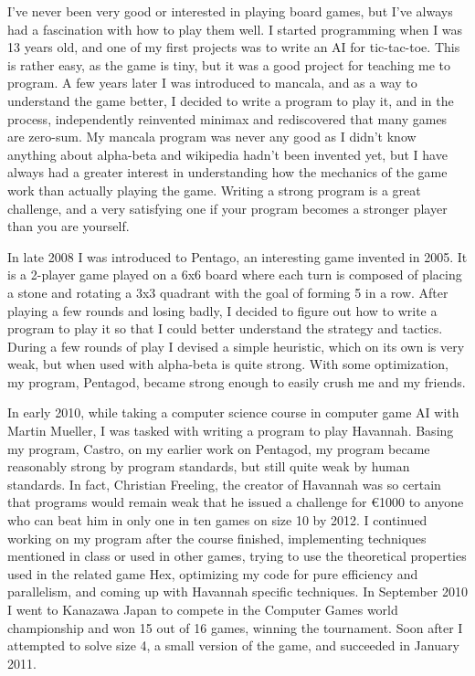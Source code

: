 I've never been very good or interested in playing board games, but I've always had a fascination with how to play them well. I started programming when I was 13 years old, and one of my first projects was to write an AI for tic-tac-toe. This is rather easy, as the game is tiny, but it was a good project for teaching me to program. A few years later I was introduced to mancala, and as a way to understand the game better, I decided to write a program to play it, and in the process, independently reinvented minimax and rediscovered that many games are zero-sum. My mancala program was never any good as I didn't know anything about alpha-beta and wikipedia hadn't been invented yet, but I have always had a greater interest in understanding how the mechanics of the game work than actually playing the game. Writing a strong program is a great challenge, and a very satisfying one if your program becomes a stronger player than you are yourself.

In late 2008 I was introduced to Pentago, an interesting game invented in 2005. It is a 2-player game played on a 6x6 board where each turn is composed of placing a stone and rotating a 3x3 quadrant with the goal of forming 5 in a row. After playing a few rounds and losing badly, I decided to figure out how to write a program to play it so that I could better understand the strategy and tactics. During a few rounds of play I devised a simple heuristic, which on its own is very weak, but when used with alpha-beta is quite strong. With some optimization, my program, Pentagod, became strong enough to easily crush me and my friends.

In early 2010, while taking a computer science course in computer game AI with Martin Mueller, I was tasked with writing a program to play Havannah. Basing my program, Castro, on my earlier work on Pentagod, my program became reasonably strong by program standards, but still quite weak by human standards. In fact, Christian Freeling, the creator of Havannah was so certain that programs would remain weak that he issued a challenge for \euro 1000 to anyone who can beat him in only one in ten games on size 10 by 2012. I continued working on my program after the course finished, implementing techniques mentioned in class or used in other games, trying to use the theoretical properties used in the related game Hex, optimizing my code for pure efficiency and parallelism, and coming up with Havannah specific techniques. In September 2010 I went to Kanazawa Japan to compete in the Computer Games world championship and won 15 out of 16 games, winning the tournament. Soon after I attempted to solve size 4, a small version of the game, and succeeded in January 2011.

